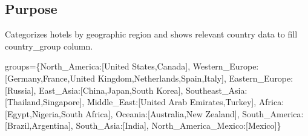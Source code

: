 \documentclass[
  letterpaper,
  DIV=11,
  numbers=noendperiod]{scrartcl}
\newenvironment{Shaded}{\begin{snugshade}}{\end{snugshade}}
\newcommand{\NormalTok}[1]{\textcolor[rgb]{0.00,0.23,0.31}{#1}}
\newcommand{\OperatorTok}[1]{\textcolor[rgb]{0.37,0.37,0.37}{#1}}
\newcommand{\StringTok}[1]{\textcolor[rgb]{0.13,0.47,0.30}{#1}}
\begin{document}
\subsection{Purpose}\label{purpose-3}

Categorizes hotels by geographic region and shows relevant country data
to fill country\_group column.

\begin{Shaded}
\begin{Highlighting}[]
\NormalTok{groups}\OperatorTok{=}\NormalTok{\{}\StringTok{\textquotesingle{}North\_America\textquotesingle{}}\NormalTok{:[}\StringTok{\textquotesingle{}United States\textquotesingle{}}\NormalTok{,}\StringTok{\textquotesingle{}Canada\textquotesingle{}}\NormalTok{],}
        \StringTok{\textquotesingle{}Western\_Europe\textquotesingle{}}\NormalTok{:[}\StringTok{\textquotesingle{}Germany\textquotesingle{}}\NormalTok{,}\StringTok{\textquotesingle{}France\textquotesingle{}}\NormalTok{,}\StringTok{\textquotesingle{}United Kingdom\textquotesingle{}}\NormalTok{,}\StringTok{\textquotesingle{}Netherlands\textquotesingle{}}\NormalTok{,}\StringTok{\textquotesingle{}Spain\textquotesingle{}}\NormalTok{,}\StringTok{\textquotesingle{}Italy\textquotesingle{}}\NormalTok{],}
        \StringTok{\textquotesingle{}Eastern\_Europe\textquotesingle{}}\NormalTok{:[}\StringTok{\textquotesingle{}Russia\textquotesingle{}}\NormalTok{],}
        \StringTok{\textquotesingle{}East\_Asia\textquotesingle{}}\NormalTok{:[}\StringTok{\textquotesingle{}China\textquotesingle{}}\NormalTok{,}\StringTok{\textquotesingle{}Japan\textquotesingle{}}\NormalTok{,}\StringTok{\textquotesingle{}South Korea\textquotesingle{}}\NormalTok{],}
        \StringTok{\textquotesingle{}Southeast\_Asia\textquotesingle{}}\NormalTok{:[}\StringTok{\textquotesingle{}Thailand\textquotesingle{}}\NormalTok{,}\StringTok{\textquotesingle{}Singapore\textquotesingle{}}\NormalTok{],}
        \StringTok{\textquotesingle{}Middle\_East\textquotesingle{}}\NormalTok{:[}\StringTok{\textquotesingle{}United Arab Emirates\textquotesingle{}}\NormalTok{,}\StringTok{\textquotesingle{}Turkey\textquotesingle{}}\NormalTok{],}
        \StringTok{\textquotesingle{}Africa\textquotesingle{}}\NormalTok{:[}\StringTok{\textquotesingle{}Egypt\textquotesingle{}}\NormalTok{,}\StringTok{\textquotesingle{}Nigeria\textquotesingle{}}\NormalTok{,}\StringTok{\textquotesingle{}South Africa\textquotesingle{}}\NormalTok{],}
        \StringTok{\textquotesingle{}Oceania\textquotesingle{}}\NormalTok{:[}\StringTok{\textquotesingle{}Australia\textquotesingle{}}\NormalTok{,}\StringTok{\textquotesingle{}New Zealand\textquotesingle{}}\NormalTok{],}
        \StringTok{\textquotesingle{}South\_America\textquotesingle{}}\NormalTok{:[}\StringTok{\textquotesingle{}Brazil\textquotesingle{}}\NormalTok{,}\StringTok{\textquotesingle{}Argentina\textquotesingle{}}\NormalTok{],}
        \StringTok{\textquotesingle{}South\_Asia\textquotesingle{}}\NormalTok{:[}\StringTok{\textquotesingle{}India\textquotesingle{}}\NormalTok{],}
        \StringTok{\textquotesingle{}North\_America\_Mexico\textquotesingle{}}\NormalTok{:[}\StringTok{\textquotesingle{}Mexico\textquotesingle{}}\NormalTok{]\}}


\end{Highlighting}
\end{Shaded}
\end{document}
